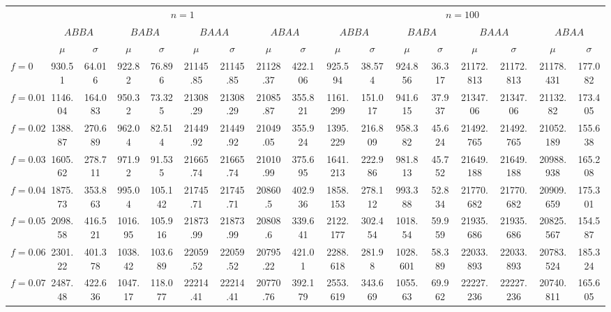 \begin{tabular}{@{}lcccccccccccccccc@{}}
\toprule
 & \multicolumn{8}{c}{$n=1$} & \multicolumn{8}{c}{$n=100$} \\
\cmidrule(lr){2-9} \cmidrule(lr){10-17}
 & \multicolumn{2}{c}{$ABBA$} & \multicolumn{2}{c}{$BABA$} & \multicolumn{2}{c}{$BAAA$} & \multicolumn{2}{c}{$ABAA$} & \multicolumn{2}{c}{$ABBA$} & \multicolumn{2}{c}{$BABA$} & \multicolumn{2}{c}{$BAAA$} & \multicolumn{2}{c}{$ABAA$} \\
\cmidrule(lr){2-3} \cmidrule(lr){4-5} \cmidrule(lr){6-7} \cmidrule(lr){8-9} \cmidrule(lr){10-11} \cmidrule(lr){12-13} \cmidrule(lr){14-15} \cmidrule(lr){16-17}
 & $\mu$ & $\sigma$ & $\mu$ & $\sigma$ & $\mu$ & $\sigma$ & $\mu$ & $\sigma$ & $\mu$ & $\sigma$ & $\mu$ & $\sigma$ & $\mu$ & $\sigma$ & $\mu$ & $\sigma$ \\
\midrule
$f = 0$ & 930.51 & 64.016 & 922.82 & 76.896 & 21145.85 & 21145.85 & 21128.37 & 422.106 & 925.594 & 38.574 & 924.856 & 36.317 & 21172.813 & 21172.813 & 21178.431 & 177.082 \\
$f = 0.01$ & 1146.04 & 164.083 & 950.32 & 73.325 & 21308.29 & 21308.29 & 21085.87 & 355.821 & 1161.299 & 151.017 & 941.615 & 37.937 & 21347.06 & 21347.06 & 21132.82 & 173.405 \\
$f = 0.02$ & 1388.87 & 270.689 & 962.04 & 82.514 & 21449.92 & 21449.92 & 21049.05 & 355.924 & 1395.229 & 216.809 & 958.382 & 45.624 & 21492.765 & 21492.765 & 21052.189 & 155.638 \\
$f = 0.03$ & 1605.62 & 278.711 & 971.92 & 91.535 & 21665.74 & 21665.74 & 21010.99 & 375.695 & 1641.213 & 222.986 & 981.813 & 45.752 & 21649.188 & 21649.188 & 20988.938 & 165.208 \\
$f = 0.04$ & 1875.73 & 353.863 & 995.04 & 105.142 & 21745.71 & 21745.71 & 20860.5 & 402.936 & 1858.153 & 278.112 & 993.388 & 52.834 & 21770.682 & 21770.682 & 20909.659 & 175.301 \\
$f = 0.05$ & 2098.58 & 416.521 & 1016.95 & 105.916 & 21873.99 & 21873.99 & 20808.6 & 339.641 & 2122.177 & 302.454 & 1018.54 & 59.959 & 21935.686 & 21935.686 & 20825.567 & 154.587 \\
$f = 0.06$ & 2301.22 & 401.378 & 1038.42 & 103.689 & 22059.52 & 22059.52 & 20795.22 & 421.01 & 2288.618 & 281.98 & 1028.601 & 58.389 & 22033.893 & 22033.893 & 20783.524 & 185.324 \\
$f = 0.07$ & 2487.48 & 422.636 & 1047.17 & 118.077 & 22214.41 & 22214.41 & 20770.76 & 392.179 & 2553.619 & 343.669 & 1055.63 & 69.962 & 22227.236 & 22227.236 & 20740.811 & 165.605 \\

\end{tabular}
